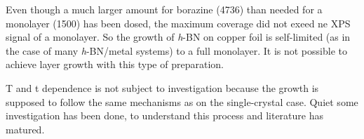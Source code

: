 Even though a much larger amount for borazine (\SI{4736}{\langmuir}) than needed for a monolayer (\SI{1500}{\langmuir}) has been dosed, the maximum coverage did not exeed ne XPS signal of a monolayer. So the growth of \textit{h}-BN on copper foil is self-limited (as in the case of many \textit{h}-BN/metal systems) to a full monolayer. It is not possible to achieve layer growth with this type of preparation.

T and t dependence is not subject to investigation because the growth is supposed to follow the same mechanisms as on the single-crystal case. Quiet some investigation has been done, \cite{orlando_epitaxial_2012,preobrajenski_monolayer_2007-1} to understand this process and literature has matured.